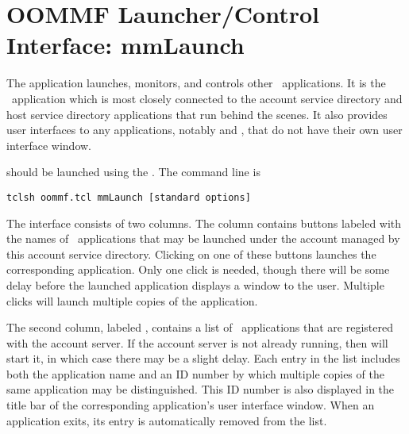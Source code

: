 \section{OOMMF Launcher/Control Interface: mmLaunch}\label{sec:mmlaunch}

\begin{center}
\end{center}

The application  launches, monitors, and controls other 
\OOMMF\ applications.  It is the \OOMMF\ application which is
most closely connected to the account service directory and host
service directory applications that run behind the scenes.  It also
provides user interfaces
to any applications, notably
 and
, that do not have their own user interface
window.

 should be launched using the .  The command
line is
\begin{verbatim}
tclsh oommf.tcl mmLaunch [standard options]
\end{verbatim}

The  interface consists of two columns. The
 column contains buttons labeled with the names of
\OOMMF\ applications that may be launched under the account managed by
this account service directory.  Clicking on one of these buttons
launches the corresponding application.  Only one click is needed,
though there will be some delay before the launched application
displays a window to the user.  Multiple clicks will launch multiple
copies of the application.

The second column, labeled , contains a list
of \OOMMF\ applications that are registered with the account
server. If the account server is not already running, then
 will start it, in which case there may be a slight
delay. Each entry in the  list includes both
the application name and an ID number by which multiple copies of the
same application may be distinguished.  This ID number is also
displayed in the title bar of the corresponding application's user
interface window.  When an application exits, its entry is
automatically removed from the  list.

